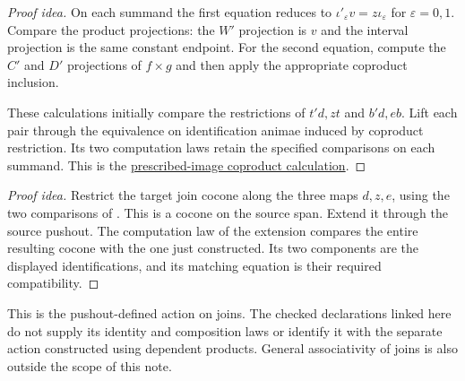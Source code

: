 \documentclass[11pt]{article}
\begin{document}
\begin{proof}[Proof idea]
On each summand the first equation reduces to
$\iota'_{\varepsilon}v=z\iota_{\varepsilon}$ for $\varepsilon=0,1$. Compare the product projections: the $W'$ projection
is $v$ and the interval projection is the same constant endpoint.
For the second equation, compute the $C'$ and $D'$ projections of $f\times g$
and then apply the appropriate coproduct inclusion.

These calculations initially compare the restrictions of $t'd,zt$ and
$b'd,eb$. Lift each pair through the equivalence on identification animae
induced by coproduct restriction. Its two computation laws retain the
specified comparisons on each summand. This is the
\href{supplementary-identifications-on-coproducts.html}{prescribed-image
coproduct calculation}.
\end{proof}

\begin{proof}[Proof idea]
Restrict the target join cocone along the three maps $d,z,e$, using the
two comparisons of .
This is a cocone on the source span. Extend it through the source pushout.
The computation law of the extension compares the entire resulting
cocone with the one just constructed. Its two components are the displayed
identifications, and its matching equation is their required compatibility.
\end{proof}

This is the pushout-defined action on joins. The checked declarations linked
here do not supply its identity and composition laws or identify it with
the separate action constructed using dependent products. General
associativity of joins is also outside the scope of this note.
\end{document}
